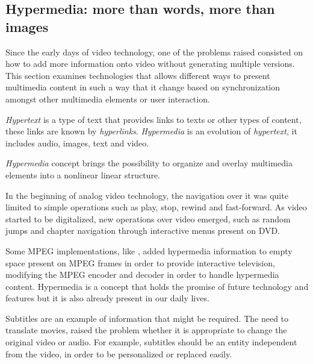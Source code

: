 \subsection{Hypermedia: more than words, more than images}
\label{hypermedia}

Since the early days of video technology, one of the problems raised consisted on how to add more information onto video without generating multiple versions. This section examines technologies that allows different ways to present multimedia content in such a way that it change based on synchronization amongst other multimedia elements or user interaction.

\emph{Hypertext} is a type of text that provides links to texts or other types of content, these links are known by \emph{hyperlinks}. \emph{Hypermedia} is an evolution of \emph{hypertext}, it includes audio, images, text and video. 

\emph{Hypermedia} concept brings the possibility to organize and overlay multimedia elements into a nonlinear linear structure.

In the beginning of analog video technology, the navigation over it was quite limited to simple operations such as play, stop, rewind and fast-forward. As video started to be digitalized, new operations over video emerged, such as random jumps and chapter navigation through interactive menus present on \ac{DVD}.


Some \ac{MPEG} implementations, like \cite{embedded}, added hypermedia information to empty space present on \ac{MPEG} frames in order to provide interactive television, modifying the \ac{MPEG} encoder and decoder in order to handle hypermedia content.
Hypermedia is a concept that holds the promise of future technology and features but it is also already present in our daily lives.

  Subtitles are an example of information that might be required.
  The need to translate movies, raised the problem whether it is appropriate to change the original video or audio. For example, subtitles should be an entity independent from the video, in order to be personalized or replaced easily.

